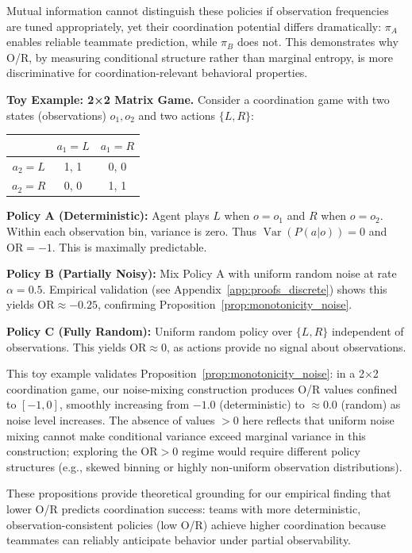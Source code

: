 \documentclass[twoside]{article}
\DeclareMathOperator{\Var}{Var}
\theoremstyle{remark}
\begin{document}
Mutual information cannot distinguish these policies if observation frequencies are tuned appropriately, yet their coordination potential differs dramatically: $\pi_A$ enables reliable teammate prediction, while $\pi_B$ does not. This demonstrates why O/R, by measuring conditional structure rather than marginal entropy, is more discriminative for coordination-relevant behavioral properties.

\textbf{Toy Example: 2×2 Matrix Game.} Consider a coordination game with two states (observations) $o_1, o_2$ and two actions $\{L, R\}$:
\begin{center}
\begin{tabular}{c|cc}
& $a_1 = L$ & $a_1 = R$ \\
\hline
$a_2 = L$ & 1, 1 & 0, 0 \\
$a_2 = R$ & 0, 0 & 1, 1 \\
\end{tabular}
\end{center}

\textbf{Policy A (Deterministic):} Agent plays $L$ when $o = o_1$ and $R$ when $o = o_2$. Within each observation bin, variance is zero. Thus $\Var(P(a|o)) = 0$ and $\mathrm{OR} = -1$. This is maximally predictable.

\textbf{Policy B (Partially Noisy):} Mix Policy A with uniform random noise at rate $\alpha = 0.5$. Empirical validation (see Appendix~\ref{app:proofs_discrete}) shows this yields $\mathrm{OR} \approx -0.25$, confirming Proposition~\ref{prop:monotonicity_noise}.

\textbf{Policy C (Fully Random):} Uniform random policy over $\{L, R\}$ independent of observations. This yields $\mathrm{OR} \approx 0$, as actions provide no signal about observations.

This toy example validates Proposition~\ref{prop:monotonicity_noise}: in a 2×2 coordination game, our noise-mixing construction produces O/R values confined to $[-1, 0]$, smoothly increasing from $-1.0$ (deterministic) to $\approx 0.0$ (random) as noise level increases. The absence of values $> 0$ here reflects that uniform noise mixing cannot make conditional variance exceed marginal variance in this construction; exploring the $\mathrm{OR} > 0$ regime would require different policy structures (e.g., skewed binning or highly non-uniform observation distributions).

These propositions provide theoretical grounding for our empirical finding that lower O/R predicts coordination success: teams with more deterministic, observation-consistent policies (low O/R) achieve higher coordination because teammates can reliably anticipate behavior under partial observability.
\end{document}
